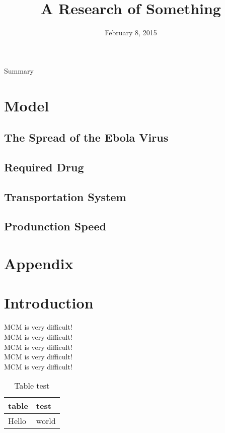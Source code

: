 \documentclass{icmmcm}
\title{A Research of Something}
\date{February 8, 2015}
\begin{document}
\begin{summary}
Summary
\end{summary}

\section{Model}
\subsection{The Spread of the Ebola Virus}
%
\subsection{Required Drug}
%
\subsection{Transportation System}
%
\subsection{Produnction Speed}


\section{Appendix}


\maketitle
\thispagestyle{fancy}
\tableofcontents


\section{Introduction}
MCM is very difficult!\\
MCM is very difficult!\\
MCM is very difficult!\\
MCM is very difficult!\\
MCM is very difficult!
\begin{table}
\centering
\begin{tabular}{|l|l|}
\hline
table & test\\
\hline
Hello & world\\
\hline
\end{tabular}
\caption{Table test}
\label{tab:1}
\end{table}
\newpage
\end{document}
